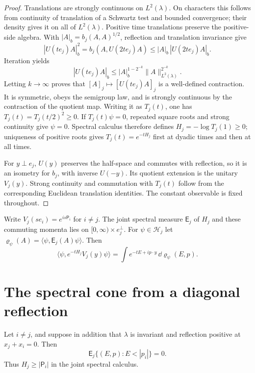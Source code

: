 \begin{proof}
Translations are strongly continuous on $L^2(\lambda)$. On
characters this follows from continuity of translation of a Schwartz
test and bounded convergence; their density gives it on all of
$L^2(\lambda)$. Positive time translations preserve the positive-side
algebra. With $|A|_b=b_j(A,A)^{1/2}$, reflection and translation
invariance give
\[
 |U(te_j)A|_b^2=b_j(A,U(2te_j)A)
 \le |A|_b\,|U(2te_j)A|_b.
\]
Iteration yields
\[
 |U(te_j)A|_b
 \le |A|_b^{1-2^{-k}}\|A\|_{L^2(\lambda)}^{2^{-k}}.
\]
Letting $k\to\infty$ proves that $[A]_j\mapsto[U(te_j)A]_j$
is a well-defined contraction. It is symmetric, obeys the semigroup
law, and is strongly continuous by the contraction of the quotient
map. Writing it as $T_j(t)$, one has
$T_j(t)=T_j(t/2)^2\ge0$. If $T_j(t)\psi=0$, repeated square roots
and strong continuity give $\psi=0$. Spectral calculus therefore
defines $H_j=-\log T_j(1)\ge0$; uniqueness of positive roots gives
$T_j(t)=e^{-tH_j}$ first at dyadic times and then at all times.

For $y\perp e_j$, $U(y)$ preserves the half-space and commutes with
reflection, so it is an isometry for $b_j$, with inverse $U(-y)$.
Its quotient extension is the unitary $V_j(y)$. Strong continuity
and commutation with $T_j(t)$ follow from the corresponding Euclidean
translation identities. The constant observable is fixed throughout.
\end{proof}

Write $V_j(se_i)=e^{is\mathsf P_i}$ for $i\ne j$. The joint spectral
measure $\mathsf E_j$ of $H_j$ and these commuting momenta lies on
$[0,\infty)\times e_j^\perp$. For $\psi\in\mathcal H_j$ let
$\varrho_\psi(A)=\langle\psi,\mathsf E_j(A)\psi\rangle$.
Then
\begin{equation}\label{eq:joint-spectral-integral}
 \langle\psi,e^{-tH_j}V_j(y)\psi\rangle
 =\int e^{-tE+ip\cdot y}\,\dd\varrho_\psi(E,p).
\end{equation}

\section{The spectral cone from a diagonal reflection}\label{sec:cone}

\begin{proposition}\label{prop:diagonal-cone}
Let $i\ne j$, and suppose in addition that $\lambda$ is invariant
and reflection positive at $x_j+x_i=0$. Then
\begin{equation}\label{eq:sharp-coordinate-cone}
 \mathsf E_j\{(E,p):E<|p_i|\}=0.
\end{equation}
Thus $H_j\ge|\mathsf P_i|$ in the joint spectral calculus.
\end{proposition}

